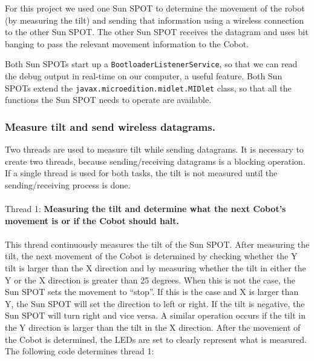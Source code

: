 \documentclass[a4paper,10pt]{article} %
\begin{document}
For this project we used one Sun SPOT to determine the movement of the robot (by
measuring the tilt) and sending that information using a wireless connection to
the other Sun SPOT. The other Sun SPOT receives the datagram and uses
bit banging to pass the relevant movement information to the Cobot.

Both Sun SPOTs start up a \texttt{BootloaderListenerService}, so that we can
read the debug output in real-time on our computer, a useful feature. Both
Sun SPOTs extend the \texttt{javax.microedition.midlet.MIDlet} class, so that all
the functions the Sun SPOT needs to operate are available.

\subsubsection{Measure tilt and send wireless datagrams.} %

Two threads are used to measure tilt while sending datagrams. It is
necessary to create two threads, because sending/receiving datagrams is a
blocking operation. If a single thread is used for both tasks, the tilt is not
measured until the sending/receiving process is done.
\\
\\
\noindent Thread 1: \textbf{Measuring the tilt and determine what the next Cobot's
movement is or if the Cobot should halt.}
\\
\\
This thread continuously measures the tilt of the Sun SPOT. After measuring the
tilt, the next movement of the Cobot is determined by checking whether the Y
tilt is larger than the X direction and by measuring whether the tilt in either
the Y or the X direction is greater than 25 degrees. When this is not the case,
the Sun SPOT sets the movement to ``stop''. If this is the case and X is larger
than Y, the Sun SPOT will set the direction to left or right. If the tilt is
negative, the Sun SPOT will turn right and vice versa. A similar operation
occurs if the tilt in the Y direction is larger than the tilt in the X
direction. After the movement of the Cobot is determined, the LEDs are set to
clearly represent what is measured. The following code determines thread 1:


\end{document}
